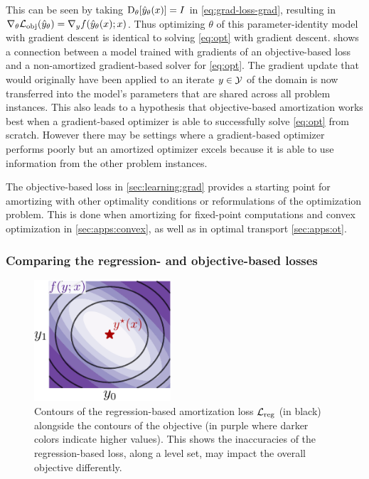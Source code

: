 This can be seen by taking $\mathrm{D}_\theta[\hat y_\theta(x)]=I$
in \cref{eq:grad-loss-grad}, resulting in
$\nabla_\theta {\mathcal{L}}_{\rm obj}(\hat y_\theta)=\nabla_y f(\hat y_\theta(x); x)$.
Thus optimizing $\theta$ of this parameter-identity model with gradient descent
is identical to solving \cref{eq:opt} with gradient descent.
 shows a connection between a model trained with
gradients of an objective-based loss and a non-amortized gradient-based
solver for \cref{eq:opt}.
The gradient update that would originally have been applied to an
iterate $y\in{\mathcal{Y}}$ of the domain is now transferred into the
model's parameters that are shared across all problem instances.
This also leads to a hypothesis that objective-based amortization
works best when a gradient-based optimizer is able to successfully
solve \cref{eq:opt} from scratch. However there may be settings
where a gradient-based optimizer performs poorly but an amortized
optimizer excels because it is able to use information from the
other problem instances.

\begin{remark}
The objective-based loss in \cref{sec:learning:grad} provides a starting
point for amortizing with other optimality conditions or reformulations
of the optimization problem. This is done when amortizing for fixed-point
computations and convex optimization in \cref{sec:apps:convex}, as well as
in optimal transport \cref{sec:apps:ot}.
\label{rmk:optimality-loss}
\end{remark}

\subsubsection{Comparing the regression- and objective-based losses}
\begin{figure}[t]
\centering
\includegraphics[width=2in]{fig/loss-comp.pdf}
\caption{Contours of the regression-based amortization loss
  ${\mathcal{L}}_{\rm reg}$ (in black) alongside the contours of the objective
  (in purple where darker colors indicate higher values).
  This shows the inaccuracies of the regression-based loss, \eg
  along a level set, may impact the overall objective differently.
}
\label{fig:reg-contours}
\end{figure}

